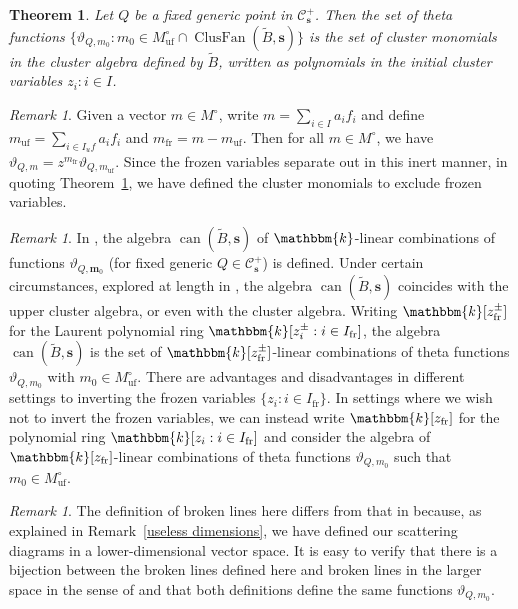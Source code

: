 \documentclass{amsart}
\newtheorem{theorem}[proposition]{Theorem}
\theoremstyle{definition}
\theoremstyle{remark}
\newtheorem{remark}[proposition]{Remark}
\numberwithin{equation}{section}
\newcommand{\thet}{\vartheta}
\newcommand{\uf}{{\operatorname{uf}}}
\newcommand{\fr}{{\operatorname{fr}}}
\newcommand{\set}[1]{{\lbrace #1 \rbrace}}
\newcommand{\0}{{\mathbf{0}}}
\newcommand{\s}{\mathbf{s}}
\newcommand{\m}{\mathbf{m}}
\renewcommand{\k}{\mathbbm{k}}
\newcommand{\tB}{\tilde{B}}
\newcommand{\C}{\mathcal{C}}
\newcommand{\ClusFan}{\operatorname{ClusFan}}
\newcommand{\can}{\operatorname{can}}
\begin{document}
\begin{theorem}\label{clus mon thm}
Let $Q$ be a fixed generic point in $\C_\s^+$.
Then the set of theta functions $\bigl\lbrace\thet_{Q,m_0}:m_0\in M_\uf^\circ\cap\ClusFan(\tB,\s)\bigr\rbrace$ is the set of cluster monomials in the cluster algebra defined by $\tB$, written as polynomials in the initial cluster variables $z_i:i\in I$.
\end{theorem}

\begin{remark}\label{what are clus mons}
Given a vector $m\in M^\circ$, write $m=\sum_{i\in I}a_if_i$ and define $m_\uf=\sum_{i\in I_uf}a_if_i$ and $m_\fr=m-m_\uf$.
Then for all $m\in M^\circ$, we have $\thet_{Q,m}=z^{m_\fr}\thet_{Q,m_\uf}$.
Since the frozen variables separate out in this inert manner, in quoting Theorem~\ref{clus mon thm}, we have defined the cluster monomials to exclude frozen variables.
\end{remark}

\begin{remark}\label{froz clus mon}
In \cite{GHKK}, the algebra $\can(\tB,\s)$ of $\k$-linear combinations of functions $\thet_{Q,\m_0}$ (for fixed generic $Q\in\C_\s^+$) is defined.
Under certain circumstances, explored at length in \cite{GHKK}, the algebra $\can(\tB,\s)$ coincides with the upper cluster algebra, or even with the cluster algebra.
Writing $\k[z^\pm_\fr]$ for the Laurent polynomial ring $\k[z_i^\pm:i\in I_\fr]$, the algebra $\can(\tB,\s)$ is the set of $\k[z^\pm_\fr]$-linear combinations of theta functions $\thet_{Q,m_0}$ with $m_0\in M^\circ_\uf$.
There are advantages and disadvantages in different settings to inverting the frozen variables $\set{z_i:i\in I_\fr}$.
In settings where we wish not to invert the frozen variables, we can instead write $\k[z_\fr]$ for the polynomial ring $\k[z_i:i\in I_\fr]$ and consider the algebra of $\k[z_\fr]$-linear combinations of theta functions $\thet_{Q,m_0}$ such that $m_0\in M^\circ_\uf$.
\end{remark}

\begin{remark}\label{useless dimensions broken lines}
The definition of broken lines here differs from that in \cite[Definition~3.1]{GHKK} because, as explained in Remark~\ref{useless dimensions}, we have defined our scattering diagrams in a lower-dimensional vector space.
It is easy to verify that there is a bijection between the broken lines defined here and broken lines in the larger space in the sense of \cite[Definition~3.1]{GHKK} and that both definitions define the same functions $\thet_{Q,m_0}$.
\end{remark}
\end{document}
